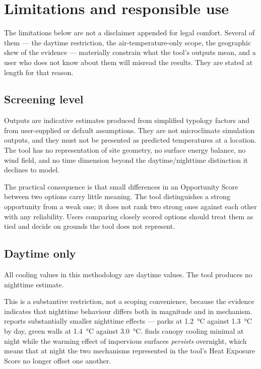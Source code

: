\section{Limitations and responsible use}
\label{sec:limitations}

The limitations below are not a disclaimer appended for legal comfort. Several
of them --- the daytime restriction, the air-temperature-only scope, the
geographic skew of the evidence --- materially constrain what the tool's
outputs mean, and a user who does not know about them will misread the results.
They are stated at length for that reason.

\subsection{Screening level}

Outputs are indicative estimates produced from simplified typology factors and
from user-supplied or default assumptions. They are not microclimate simulation
outputs, and they must not be presented as predicted temperatures at a
location. The tool has no representation of site geometry, no surface energy
balance, no wind field, and no time dimension beyond the daytime/nighttime
distinction it declines to model.

The practical consequence is that small differences in an Opportunity Score
between two options carry little meaning. The tool distinguishes
a strong opportunity from a weak one; it does not rank two strong ones against
each other with any reliability. Users comparing closely scored options should
treat them as tied and decide on grounds the tool does not represent.

\subsection{Daytime only}
\label{sec:limit-daytime}

All cooling values in this methodology are daytime values. The tool produces no
nighttime estimate.

This is a substantive restriction, not a scoping convenience, because the
evidence indicates that nighttime behaviour differs both in magnitude and in
mechanism. \textcite{keravec2026} reports substantially smaller nighttime
effects --- parks at \qty{1.2}{\degreeCelsius} against
\qty{1.3}{\degreeCelsius} by day, green walls at \qty{1.4}{\degreeCelsius}
against \qty{3.0}{\degreeCelsius}. \textcite{ziter2019} finds canopy cooling
minimal at night while the warming effect of impervious surfaces
\emph{persists} overnight, which means that at night the two mechanisms
represented in the tool's Heat Exposure Score no longer offset one another.


